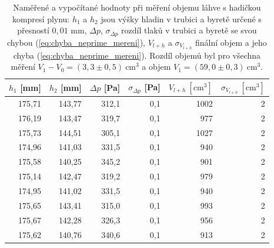 \documentclass[english]{article}
\newcommand{\unit}[1]{\mathrm{#1}}
\begin{document}
\begin{table}[htbp]
  \centering
    \begin{tabular}{|r|r|r|r|r|r|}
    \hline
    $h_1$ [mm] & $h_2$ [mm] & $\Delta p$ [Pa] & $\sigma_{\Delta p}$ [Pa] & $V_{l+h}\unit{\ [cm^3]}$ & $\sigma_{V_{l+h}}\unit{\ [cm^3]}$ \bigstrut\\
    \hline
    175,71 & 143,77 & 312,1 & 0,1   & 1002  & 2 \bigstrut\\
    \hline
    176,19 & 143,47 & 319,7 & 0,1   & 977   & 2 \bigstrut\\
    \hline
    175,73 & 144,51 & 305,1 & 0,1   & 1027  & 2 \bigstrut\\
    \hline
    174,96 & 141,03 & 331,5 & 0,1   & 940   & 2 \bigstrut\\
    \hline
    175,58 & 140,25 & 345,2 & 0,1   & 901   & 2 \bigstrut\\
    \hline
    175,14 & 142,47 & 319,2 & 0,1   & 979   & 2 \bigstrut\\
    \hline
    174,95 & 141,02 & 331,5 & 0,1   & 940   & 2 \bigstrut\\
    \hline
    175,65 & 143,41 & 315,0 & 0,1   & 993   & 2 \bigstrut\\
    \hline
    175,67 & 142,28 & 326,3 & 0,1   & 956   & 2 \bigstrut\\
    \hline
    175,62 & 140,76 & 340,6 & 0,1   & 913   & 2 \bigstrut\\
    \hline
    \end{tabular}%


\caption{Naměřené a vypočítané hodnoty při měření objemu láhve s hadičkou kompresí plynu: $h_1$ a $h_2$ jsou výšky hladin v trubici a byretě určené s přesností $0,01$ mm, $\Delta p$, $\sigma_{\Delta p}$ rozdíl tlaků v trubici a byretě se svou chybou (\ref{eq:chyba_neprime_mereni}), $V_{l+h}$ a $\sigma_{V_{l+h}}$ finální objem a jeho chyba (\ref{eq:chyba_neprime_mereni}). Rozdíl objemů byl pro všechna měření $V_1-V_0 = (3,3\pm0,5)\unit{\ cm^3}$ a objem $V_1 = (59,0\pm0,3)\unit{\ cm^3}.$}
 \label{tab:komprese_1}%
\end{table}%
\end{document}
